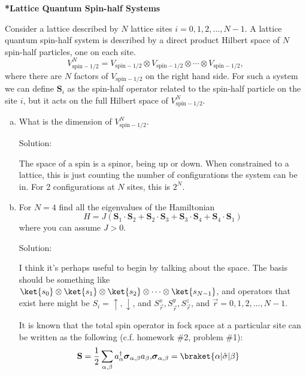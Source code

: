 \begin{homeworkProblem}
\textbf{*Lattice Quantum Spin-half Systems}

Consider a lattice described by $N$ lattice sites $i = 0, 1, 2, \ldots, N-1$. A lattice quantum spin-half system is described by a direct product Hilbert space of $N$ spin-half particles, one on each site.
\[
V^{N}_{\mathrm{spin-1/2}} = V_{\mathrm{spin-1/2}} \otimes V_{\mathrm{spin-1/2}} \otimes \cdots \otimes V_{\mathrm{spin-1/2}},
\]
where there are $N$ factors of $V_{\mathrm{spin-1/2}}$ on the right hand side. For such a system we can define $\mathbf{S}_i$ as the spin-half operator related to the spin-half particle on the site $i$, but it acts on the full Hilbert space of $V^{N}_{\mathrm{spin-1/2}}$.

\begin{enumerate}[a.]
    \item What is the dimension of $V^{N}_{\mathrm{spin-1/2}}$.
        \begin{callout}{Solution:}

        The space of a spin is a spinor, being up or down. When constrained to a lattice, this is just counting the number of configurations the system can be in. For 2 configurations at $N$ sites, this is $2^N$.

        \end{callout}
    
    \item For $N = 4$ find all the eigenvalues of the Hamiltonian
    \[
    H = J\left(\mathbf{S}_1 \cdot \mathbf{S}_2 + \mathbf{S}_2 \cdot \mathbf{S}_3 + \mathbf{S}_3 \cdot \mathbf{S}_4 + \mathbf{S}_4 \cdot \mathbf{S}_1\right)
    \]
    where you can assume $J > 0$.
    \begin{callout}{Solution:}

        I think it's perhaps useful to begin by talking about the space. The basis should be something like $\ket{s_{0}} \otimes \ket{s_{1}} \otimes \ket{s_{2}} \otimes\dots \otimes\ket{s_{N-1}}$, and operators that exist here might be $S_{i}=\uparrow, \downarrow$, and $S_{\vec{r}}^{x},S_{\vec{r}}^{y},S_{\vec{r}}^z$, and $\vec{r}=0,1,2,\dots,N-1$.

    It is known that the total spin operator in fock space at a particular site can be written as the following (c.f. homework \#2, problem \#1):
    \begin{align*}
        \mathbf{S} = \frac{1}{2} \sum_{\alpha, \beta} a^\dagger_{\alpha} \boldsymbol{\sigma}_{\alpha,\beta}a_{\beta}, &\boldsymbol{\sigma}_{\alpha,\beta} = \braket{\alpha|\hat{\sigma}|\beta}
    \end{align*}


\end{callout}
\end{enumerate}
\end{homeworkProblem}
